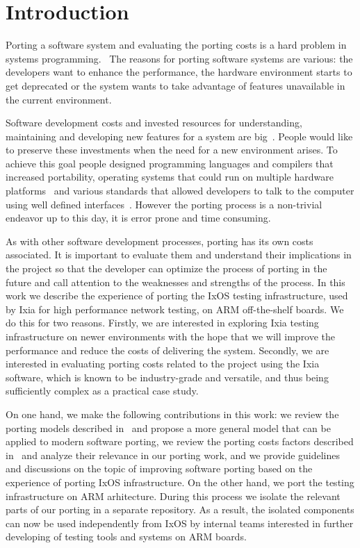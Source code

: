 \chapter{Introduction}\pagestyle{fancy}

Porting a software system and evaluating the porting costs is a hard problem in
systems
programming.~\cite{tanaka,hakuta,mooney2004developing,kanai,porquet2015,
bodenstab1984unix,osdevcrossport,jolitz1990porting,frakes1995sixteen,
tanenbaum1978guidelines,johnson1978unix}
The reasons for porting software systems are various: the developers want to
enhance the performance, the hardware environment starts to get deprecated or
the system wants to take advantage of features unavailable in the current
environment.

Software development costs and invested resources for understanding, maintaining
and developing new features for a system are
big~\cite{xia2017measuring,boehm2000software,morgan1994controlling}. People would
like to preserve these investments when the need for a new environment arises.
To achieve this goal people designed programming languages and compilers that
increased portability, operating systems that could run on multiple hardware
platforms~\cite{johnson1978unix} and various standards that allowed developers to talk to
the computer using well defined interfaces~\cite{walli1995posix}. However the porting
process is a non-trivial endeavor up to this day, it is error prone and time
consuming.

As with other software development processes, porting has its own costs
associated. It is important to evaluate them and understand their implications
in the project so that the developer can optimize the process of porting in the
future and call attention to the weaknesses and strengths of the process. In
this work we describe the experience of porting the IxOS testing infrastructure,
used by Ixia for high performance network testing, on ARM off-the-shelf boards.
We do this for two reasons. Firstly, we are interested in exploring Ixia testing
infrastructure on newer environments with the hope that we will improve the
performance and reduce the costs of delivering the system. Secondly, we are
interested in evaluating porting costs related to the project using the Ixia
software, which is known to be industry-grade and versatile, and thus being
sufficiently complex as a practical case study.

On one hand, we make the following contributions in this work: we review the
porting models described in~\cite{tanaka,hakuta,kanai} and propose a more
general model that can be applied to modern software porting, we review the
porting costs factors described in~\cite{hakuta} and analyze their relevance in
our porting work, and we provide guidelines and discussions on the topic of
improving software porting based on the experience of porting IxOS
infrastructure. On the other hand, we port the testing infrastructure on ARM
arhitecture. During this process we isolate the relevant parts of our porting
in a separate repository. As a result, the isolated components can now be used
independently from IxOS by internal teams interested in further developing of
testing tools and systems on ARM boards.

